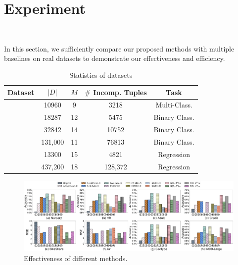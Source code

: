 
\section{Experiment}~\label{sec:exp}


In this section, we sufficiently compare our proposed methods with multiple baselines on real datasets to demonstrate our effectiveness and efficiency. 

\begin{table}
	\centering
	\caption{Statistics of datasets}
	\vspace{-1em}
	{\small
	\begin{tabular}{ccccc}
		\hline
		{\bf Dataset} & {\bf $|D|$} & {\bf $M$} & {\bf $\#$ Incomp. Tuples} & {\bf Task}\\
		\hline	
		\nursery & 	10960 & 9 & 3218 & Multi-Class. \\
		\hr & 18287 & 12 & 5475 & Binary Class. \\
		\adult & 32842 & 14 & 10752 & Binary Class. \\
		\credit & 131,000 & 11 & 76813 & Binary Class. \\
		\bike & 13300 & 15 & 4821 & Regression \\
		\air & 437,200  & 18 & 128,372 & Regression\\
		\hline
	\end{tabular}
	}
	\label{tbl:dataset}
\end{table}



\begin{figure}
	\centering
	\includegraphics[width=\textwidth]{figs/effectiveness_new.pdf}
	\caption{Effectiveness of different methods.}
	\label{fig:effectiveness}
\end{figure}



